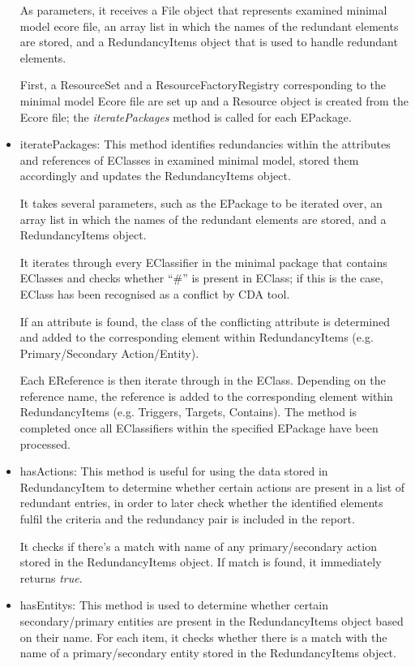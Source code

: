 \begin{itemize}
	As parameters, it receives a File object that represents examined minimal model ecore file, an array list in which the names of the redundant elements are stored, and a RedundancyItems object that is used to handle redundant elements. 
	
	First, a ResourceSet and a ResourceFactoryRegistry corresponding to the minimal model Ecore file are set up and a Resource object is created from the Ecore file; the \textit{iteratePackages} method is called for each EPackage.
	
	\item iteratePackages: This method identifies redundancies within the attributes and references of EClasses in examined minimal model, stored them accordingly and updates the RedundancyItems object.
	
	It takes several parameters, such as the EPackage to be iterated over, an array list in which the names of the redundant elements are stored, and a RedundancyItems object. 
	
	It iterates through every EClassifier in the minimal package that contains EClasses and checks whether \enquote{\#} is present in EClass; if this is the case, EClass has been recognised as a conflict by CDA tool.
	
	If an attribute is found, the class of the conflicting attribute is determined and added to the corresponding element within RedundancyItems (e.g. Primary/Secondary Action/Entity). 
	
	Each EReference is then iterate through in the EClass. Depending on the reference name, the reference is added to the corresponding element within RedundancyItems (e.g. Triggers, Targets, Contains). The method is completed once all EClassifiers within the specified EPackage have been processed.
	
	\item hasActions: This method is useful for using the data stored in RedundancyItem to determine whether certain actions are present in a list of redundant entries, in order to later check whether the identified elements fulfil the criteria and the redundancy pair is included in the report.
	
	It checks if there's a match with name of any primary/secondary action stored in the RedundancyItems object. If match is found, it immediately returns \textit{true}.
	
	\item hasEntitys: This method is used to determine whether certain secondary/primary entities  are present in the RedundancyItems object based on their name. For each item, it checks whether there is a match with the name of a primary/secondary entity stored in the RedundancyItems object. 
	

\end{itemize}
